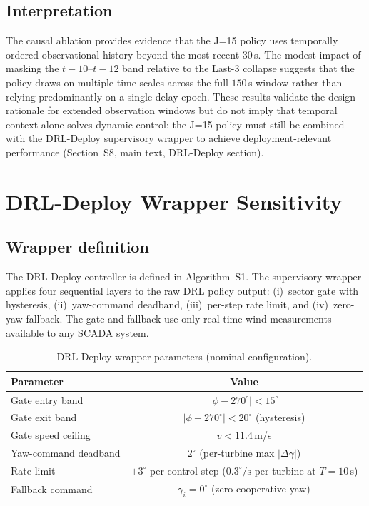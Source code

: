 \documentclass{article}
\begin{document}
\subsection{Interpretation}

The causal ablation provides evidence that the J=15 policy uses temporally ordered observational history beyond the most recent $30$\,s. The modest impact of masking the $t{-}10$--$t{-}12$ band relative to the Last-3 collapse suggests that the policy draws on multiple time scales across the full $150$\,s window rather than relying predominantly on a single delay-epoch. These results validate the design rationale for extended observation windows but do not imply that temporal context alone solves dynamic control: the J=15 policy must still be combined with the DRL-Deploy supervisory wrapper to achieve deployment-relevant performance (Section~S8, main text, DRL-Deploy section).

\section{DRL-Deploy Wrapper Sensitivity}\label{sec:deploy_sens}

\subsection{Wrapper definition}

The DRL-Deploy controller is defined in Algorithm~S1. The supervisory wrapper applies four sequential layers to the raw DRL policy output: (i)~sector gate with hysteresis, (ii)~yaw-command deadband, (iii)~per-step rate limit, and (iv)~zero-yaw fallback. The gate and fallback use only real-time wind measurements available to any SCADA system.

\begin{table}[h]
\centering
\caption{DRL-Deploy wrapper parameters (nominal configuration).}
\label{tab:deploy_params}
\small
\begin{tabular}{lc}
\toprule
Parameter & Value \\
\midrule
Gate entry band  & $|\phi{-}270^\circ| < 15^\circ$ \\
Gate exit band   & $|\phi{-}270^\circ| < 20^\circ$ (hysteresis) \\
Gate speed ceiling & $v < 11.4$\,m/s \\
Yaw-command deadband & $2^\circ$ (per-turbine max $|\Delta\gamma|$) \\
Rate limit        & ${\pm}3^\circ$ per control step ($0.3^\circ\!/\!\mathrm{s}$ per turbine at $T{=}10$\,s) \\
Fallback command  & $\gamma_i = 0^\circ$ (zero cooperative yaw) \\
\bottomrule
\end{tabular}
\end{table}
\end{document}

